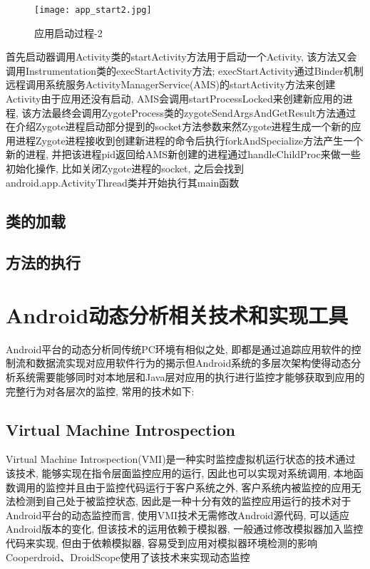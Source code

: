 \begin{figure}[ht]
	\centering
	\texttt{[image: app\_start2.jpg]}
	\caption{应用启动过程-2}
	\label{appStart2}
\end{figure}
首先启动器调用Activity类的startActivity方法用于启动一个Activity, 该方法又会调用Instrumentation类的execStartActivity方法; execStartActivity通过Binder机制远程调用系统服务ActivityManagerService(AMS)的startActivity方法来创建Activity\juhao 由于应用还没有启动, AMS会调用startProcessLocked来创建新应用的进程, 该方法最终会调用ZygoteProcess类的zygoteSendArgsAndGetResult方法通过在介绍Zygote进程启动部分提到的socket方法参数来然Zygote进程生成一个新的应用进程\juhao Zygote进程接收到创建新进程的命令后执行forkAndSpecialize方法产生一个新的进程, 并把该进程pid返回给AMS\juhao 新创建的进程通过handleChildProc来做一些初始化操作, 比如关闭Zygote进程的socket, 之后会找到android.app.ActivityThread类并开始执行其main函数\juhao



\subsection{类的加载}


\subsection{方法的执行}


\section{Android动态分析相关技术和实现工具}
Android平台的动态分析同传统PC环境有相似之处, 即都是通过追踪应用软件的控制流和数据流实现对应用软件行为的揭示\juhao 但Android系统的多层次架构使得动态分析系统需要能够同时对本地层和Java层对应用的执行进行监控才能够获取到应用的完整行为\juhao 对各层次的监控, 常用的技术如下:

\subsection{Virtual Machine Introspection}
Virtual Machine Introspection(VMI)是一种实时监控虚拟机运行状态的技术\juhao 通过该技术, 能够实现在指令层面监控应用的运行, 因此也可以实现对系统调用, 本地函数调用的监控\juhao 并且由于监控代码运行于客户系统之外, 客户系统内被监控的应用无法检测到自己处于被监控状态, 因此是一种十分有效的监控应用运行的技术\juhao 对于Android平台的动态监控而言, 使用VMI技术无需修改Android源代码, 可以适应Android版本的变化, 但该技术的运用依赖于模拟器, 一般通过修改模拟器加入监控代码来实现, 但由于依赖模拟器, 容易受到应用对模拟器环境检测的影响\juhao Cooperdroid、DroidScope使用了该技术来实现动态监控\juhao

